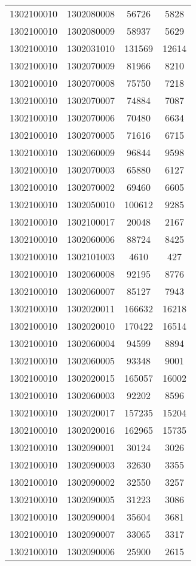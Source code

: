 \begin{longtable}[h]{llcc}
		1302100010 & 1302080008 & 56726 & 5828\\
		1302100010 & 1302080009 & 58937 & 5629\\
		1302100010 & 1302031010 & 131569 & 12614\\
		1302100010 & 1302070009 & 81966 & 8210\\
		1302100010 & 1302070008 & 75750 & 7218\\
		1302100010 & 1302070007 & 74884 & 7087\\
		1302100010 & 1302070006 & 70480 & 6634\\
		1302100010 & 1302070005 & 71616 & 6715\\
		1302100010 & 1302060009 & 96844 & 9598\\
		1302100010 & 1302070003 & 65880 & 6127\\
		1302100010 & 1302070002 & 69460 & 6605\\
		1302100010 & 1302050010 & 100612 & 9285\\
		1302100010 & 1302100017 & 20048 & 2167\\
		1302100010 & 1302060006 & 88724 & 8425\\
		1302100010 & 1302101003 & 4610 & 427\\
		1302100010 & 1302060008 & 92195 & 8776\\
		1302100010 & 1302060007 & 85127 & 7943\\
		1302100010 & 1302020011 & 166632 & 16218\\
		1302100010 & 1302020010 & 170422 & 16514\\
		1302100010 & 1302060004 & 94599 & 8894\\
		1302100010 & 1302060005 & 93348 & 9001\\
		1302100010 & 1302020015 & 165057 & 16002\\
		1302100010 & 1302060003 & 92202 & 8596\\
		1302100010 & 1302020017 & 157235 & 15204\\
		1302100010 & 1302020016 & 162965 & 15735\\
		1302100010 & 1302090001 & 30124 & 3026\\
		1302100010 & 1302090003 & 32630 & 3355\\
		1302100010 & 1302090002 & 32550 & 3257\\
		1302100010 & 1302090005 & 31223 & 3086\\
		1302100010 & 1302090004 & 35604 & 3681\\
		1302100010 & 1302090007 & 33065 & 3317\\
		1302100010 & 1302090006 & 25900 & 2615\\

\end{longtable}
